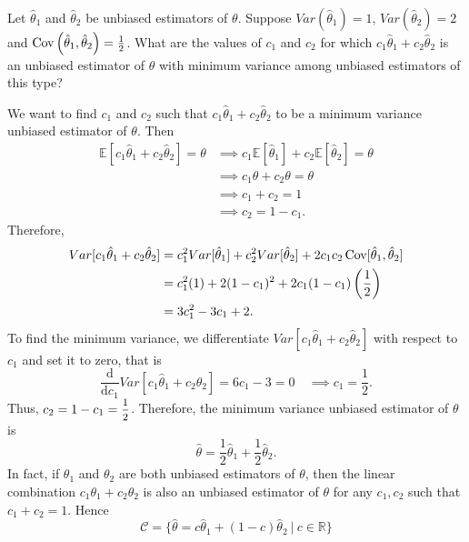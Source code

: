 \begin{example}
    Let $\hat{\theta}_1$ and $\hat{\theta}_2$ be unbiased estimators of $\theta$. Suppose $Var\left(\hat{\theta}_1\right) = 1$, $Var\left(\hat{\theta}_2\right) = 2$ and $\operatorname*{Cov} \left(\hat{\theta}_1, \hat{\theta}_2\right) = \frac{1}{2}$. What are the values of $c_1$ and $c_2$ for which $c_1\hat{\theta}_1 + c_2\hat{\theta}_2$ is an unbiased estimator of $\theta$ with minimum variance among unbiased estimators of this type?
\end{example}
\begin{solution}
    We want to find $c_1$ and $c_2$ such that $c_1\hat{\theta}_1 + c_2\hat{\theta}_2$ to be a minimum variance unbiased estimator of $\theta$. Then
    \begin{align*}
        \mathbb{E}[c_1\hat{\theta}_1 + c_2\hat{\theta}_2] = \theta &\implies c_1\mathbb{E}[\hat{\theta}_1] + c_2\mathbb{E}[\hat{\theta}_2] = \theta\\
        &\implies c_1\theta + c_2\theta = \theta\\
        &\implies c_1 + c_2 = 1\\
        &\implies c_2 = 1 - c_1.
    \end{align*}
    Therefore,
    \begin{align*}
        Var[c_1\hat{\theta}_1 + c_2\hat{\theta}_2] &= c_1^2 Var[\hat{\theta}_1] + c_2^2 Var[\hat{\theta}_2] + 2c_1c_2 \operatorname*{Cov}[\hat{\theta}_1, \hat{\theta}_2]\\
        &= c_1^2 (1) + 2(1 - c_1)^2 + 2c_1(1 - c_1)\left(\frac{1}{2}\right)\\
        &= 3c_1^2 - 3c_1 + 2.
    \end{align*}
    To find the minimum variance, we differentiate $Var[c_1\hat{\theta}_1 + c_2\hat{\theta}_2]$ with respect to $c_1$ and set it to zero, that is
    \[
        \frac{\mathrm{d}}{\mathrm{d}c_1}Var[c_1\hat{\theta}_1 + c_2\hat{\theta}_2] = 6c_1 - 3 = 0 \quad \implies c_1 = \frac{1}{2}.
    \]
    Thus, $c_2 = 1 - c_1 = \mfrac{1}{2}$. Therefore, the minimum variance unbiased estimator of $\theta$ is 
    \[
        \hat{\theta} = \frac{1}{2}\hat{\theta}_1 + \frac{1}{2}\hat{\theta}_2.
    \]
    In fact, if $\theta_1$ and $\theta_2$ are both unbiased estimators of $\theta$, then the 
    linear combination $c_1\theta_1 + c_2\theta_2$ is also an unbiased estimator of $\theta$ for any $c_1, c_2$ such that $c_1 + c_2 = 1$.
    Hence
    \[
        \mathcal{C} = \{ \hat{\theta} = c\hat{\theta}_1 + (1-c)\hat{\theta}_2 \> | \> c \in \mathbb{R} \}
    \]
\end{solution}

